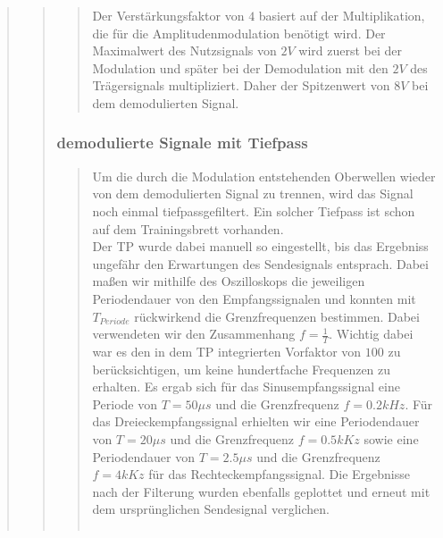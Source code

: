 \begin{quote}
\begin{quote}
\begin{quote}
                    Der Verstärkungsfaktor von $4$ basiert auf der
                    Multiplikation, die für die Amplitudenmodulation benötigt wird. 
                    Der Maximalwert des Nutzsignals von $2V$ wird zuerst bei der Modulation und später
                    bei der Demodulation mit den $2V$ des Trägersignals multipliziert. Daher der Spitzenwert von $8V$
                    bei dem demodulierten Signal.\\
                    
     			
		\end{quote}
		
		\subsubsection{demodulierte Signale mit Tiefpass}
		\begin{quote}
                    Um die durch die Modulation entstehenden Oberwellen wieder von dem demodulierten Signal zu
                    trennen, wird das Signal noch einmal tiefpassgefiltert. Ein
                    solcher Tiefpass ist schon auf dem Trainingsbrett vorhanden.\\
                    Der TP wurde dabei manuell so eingestellt, bis das Ergebniss ungefähr 
                    den Erwartungen des Sendesignals entsprach. Dabei maßen wir
                    mithilfe des Oszilloskops die jeweiligen Periodendauer von den
                    Empfangssignalen und konnten mit $T_{Periode}$ rückwirkend die
                    Grenzfrequenzen bestimmen. Dabei verwendeten wir den
                    Zusammenhang $f = \frac{1}{T}$. Wichtig dabei war es den in dem
                    TP integrierten Vorfaktor von $100$ zu berücksichtigen, um keine 
                    hundertfache Frequenzen zu erhalten. Es ergab sich für das
                    Sinusempfangssignal eine Periode von $T = 50\mu s$ und die
                    Grenzfrequenz $f = 0.2 kHz$. Für das Dreieckempfangssignal
                    erhielten wir eine Periodendauer von $T = 20\mu s$ und die Grenzfrequenz
                    $f = 0.5 kKz$ sowie eine Periodendauer von $T = 2.5\mu s$ und
                    die Grenzfrequenz $f = 4 kKz$ für das Rechteckempfangssignal.
                    Die Ergebnisse nach der Filterung wurden ebenfalls geplottet und
                    erneut mit dem ursprünglichen Sendesignal verglichen.
                    
                    \begin{center}
                \begin{tabular}{ll}
    

\end{tabular}
\end{center}
\end{quote}
\end{quote}
\end{quote}
